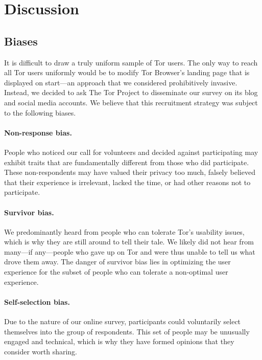 \section{Discussion}
\label{sec:discussion}

\subsection{Biases}

It is difficult to draw a truly uniform sample of Tor users.  The only way to
reach all Tor users uniformly would be to modify Tor Browser's landing page
that is displayed on start---an approach that we considered prohibitively
invasive.  Instead, we decided to ask The Tor Project to disseminate our survey
on its blog and social media accounts.  We believe that this recruitment
strategy was subject to the following biases.

\paragraph{Non-response bias.} 
People who noticed our call for volunteers and decided against participating
may exhibit traits that are fundamentally different from those who did
participate.  These non-respondents may have valued their privacy too much,
falsely believed that their experience is irrelevant, lacked the time, or had
other reasons not to participate.

\paragraph{Survivor bias.}
We predominantly heard from people who can tolerate Tor's usability issues,
which is why they are still around to tell their tale.  We likely did not hear
from many---if any---people who gave up on Tor and were thus unable to tell us
what drove them away.  The danger of survivor bias lies in optimizing the user
experience for the subset of people who can tolerate a non-optimal user
experience.

\paragraph{Self-selection bias.}
Due to the nature of our online survey, participants could voluntarily select
themselves into the group of respondents.  This set of people may be unusually
engaged and technical, which is why they have formed opinions that they
consider worth sharing.

